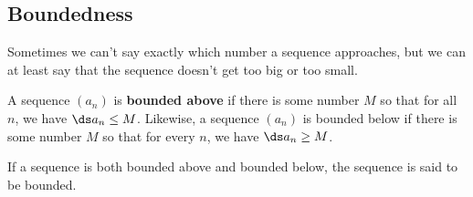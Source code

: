 \documentclass{ximera}
\newcommand{\defnword}[1]{\textbf{#1}}
\renewcommand{\index}[1]{}
\begin{document}
\subsection{Boundedness}

Sometimes we can't say exactly which number a sequence approaches, but
we can at least say that the sequence doesn't get too big or too
small.

\begin{definition}
  \label{definition:sequence-bounded}
  A sequence $(a_n)$ is \defnword{bounded
    above}\index{sequence!bounded above} if there is some number
$M$ so that for all $n$, we have $\ds a_n\le M$.  Likewise, a sequence
$(a_n)$ is {\dfont bounded below\index{sequence!bounded below}\/} if
there is some number $M$ so that for every $n$, we have $\ds a_n\ge M$.

If a sequence is both bounded above and bounded below, the sequence is said
to be {\dfont bounded\index{sequence!bounded}\/}.
\end{definition}

\end{document}

